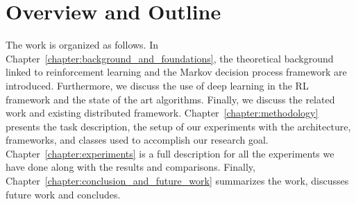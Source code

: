 \section{Overview and Outline}
The work is organized as follows. In Chapter~\ref{chapter:background_and_foundations}, the theoretical background linked to reinforcement learning and the Markov decision process framework are introduced. Furthermore, we discuss the use of deep learning in the RL framework and the state of the art algorithms. Finally, we discuss the related work and existing distributed framework. Chapter~\ref{chapter:methodology} presents the task description, the setup of our experiments with the architecture, frameworks, and classes used to accomplish our research goal. Chapter~\ref{chapter:experiments} is a full description for all the experiments we have done along with the results and comparisons. Finally, Chapter~\ref{chapter:conclusion_and_future_work} summarizes the work, discusses future work and concludes.